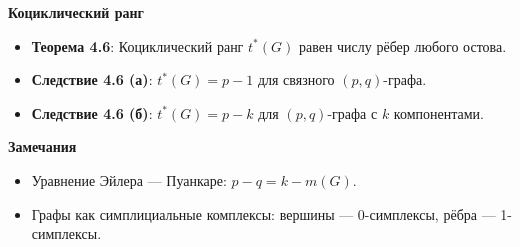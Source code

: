 \textbf{Коциклический ранг}
\begin{itemize}
    \item \textbf{Теорема 4.6}: Коциклический ранг $t^*(G)$ равен числу рёбер любого остова.
    \item \textbf{Следствие 4.6 (а)}: $t^*(G) = p - 1$ для связного $(p, q)$-графа.
    \item \textbf{Следствие 4.6 (б)}: $t^*(G) = p - k$ для $(p, q)$-графа с $k$ компонентами.
\end{itemize}

\textbf{Замечания}
\begin{itemize}
    \item Уравнение Эйлера — Пуанкаре: $p - q = k - m(G)$.
    \item Графы как симплициальные комплексы: вершины — 0-симплексы, рёбра — 1-симплексы.
\end{itemize}